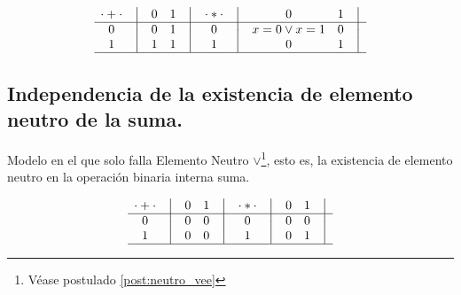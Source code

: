 \[
    \begin{matrix}
        {\cdot + \cdot} & \big{\vert} & {0} & {1} & \big{\vert} \\
        \hline
        {0}             & \big{\vert} & {0} & {1} & \big{\vert} \\
        {1}             & \big{\vert} & {1} & {1} & \big{\vert} \\
        \hline
    \end{matrix}
    \quad
    \begin{matrix}
        {\cdot * \cdot} & \big{\vert} & {0} & {1} & \big{\vert} \\
        \hline
        {0}                   & \big{\vert} & {x=0 \vee x=1} & {0} & \big{\vert} \\
        {1}                   & \big{\vert} & {0} & {1} & \big{\vert} \\
        \hline
    \end{matrix}
\]



\subsection{Independencia de la existencia de elemento neutro de la suma.}



Modelo en el que solo falla Elemento Neutro $\vee$\footnote{Véase postulado \ref{post:neutro_vee}}, esto es, la existencia de
elemento neutro en la operación binaria interna suma.



\[
    \begin{matrix}
        {\cdot + \cdot} & \big{\vert} & {0} & {1} & \big{\vert} \\
        \hline
        {0}             & \big{\vert} & {0} & {0} & \big{\vert} \\
        {1}             & \big{\vert} & {0} & {0} & \big{\vert} \\
        \hline
    \end{matrix}
    \quad
    \begin{matrix}
        {\cdot * \cdot} & \big{\vert} & {0} & {1} & \big{\vert} \\
        \hline
        {0}                   & \big{\vert} & {0} & {0} & \big{\vert} \\
        {1}                   & \big{\vert} & {0} & {1} & \big{\vert} \\
        \hline
    \end{matrix}
\]


